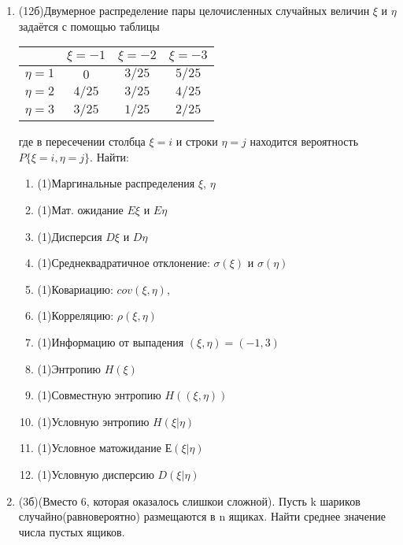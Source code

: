 \documentclass[a4paper, 14pt]{extarticle}
\begin{document}
\begin{enumerate}
\newpage
 \item 
(12б)Двумерное распределение пары целочисленных случайных величин $\xi$ и $\eta$ задаётся с помощью таблицы

\begin{center}
\begin{tabular}{|c|c|c|c|}
\hline
 & $\xi = -1$ & $\xi = -2$ & $\xi = -3$\\
\hline
$\eta = 1$ & $ 0 $ & $3/25$ & $5/25$\\ 
\hline
$\eta = 2$ & $4/25$ & $3/25$ & $4/25$\\ 
\hline
$\eta = 3$ & $3/25$ & $1/25$ & $2/25$\\ 

\hline
\end{tabular}

\end{center}
где в пересечении столбца $\xi = i$ и строки $\eta = j$ находится вероятность $P\lbrace{\xi = i, \eta = j\rbrace}$. Найти:

\begin{enumerate}
    \item (1)Маргинальные распределения $\xi$, $\eta$
    \item (1)Мат. ожидание $E\xi$ и $E\eta$
    \item (1)Дисперсия $D\xi$ и $D\eta$
    \item (1)Среднеквадратичное отклонение: $\sigma(\xi)$ и $\sigma(\eta)$ 
    \item (1)Ковариацию: $cov(\xi, \eta) $,
    \item (1)Корреляцию: $\rho(\xi, \eta)$
    \item (1)Информацию от выпадения $(\xi,\eta)=(-1,3)$
    \item (1)Энтропию $H(\xi)$
    \item (1)Совместную энтропию $H((\xi, \eta))$
    \item (1)Условную энтропию $H(\xi|\eta)$
    \item (1)Условное матожидание $Е(\xi|\eta)$
    \item (1)Условную дисперсию $D(\xi|\eta)$
\end{enumerate}

\item(3б)(Вместо 6, которая оказалось слишкои сложной). 
Пусть k шариков случайно(равновероятно) размещаются в n
ящиках. Найти среднее значение числа пустых ящиков.    


\end{enumerate}
\end{document}
